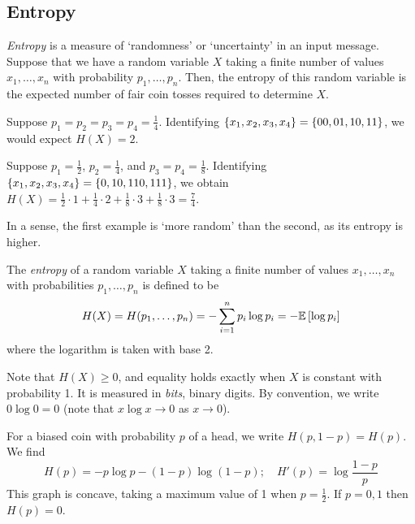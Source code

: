 \subsection{Entropy}
\emph{Entropy} is a measure of `randomness' or `uncertainty' in an input message.
Suppose that we have a random variable \( X \) taking a finite number of values \( x_1, \dots, x_n \) with probability \( p_1, \dots, p_n \).
Then, the entropy of this random variable is the expected number of fair coin tosses required to determine \( X \).
\begin{example}
    Suppose \( p_1 = p_2 = p_3 = p_4 = \frac{1}{4} \).
    Identifying \( \qty{x_1, x_2, x_3, x_4} = \qty{00, 01, 10, 11} \), we would expect \( H(X) = 2 \).
\end{example}
\begin{example}
    Suppose \( p_1 = \frac{1}{2} \), \( p_2 = \frac{1}{4} \), and \( p_3 = p_4 = \frac{1}{8} \).
    Identifying \( \qty{x_1, x_2, x_3, x_4} = \qty{0, 10, 110, 111} \), we obtain \( H(X) = \frac{1}{2} \cdot 1 + \frac{1}{4} \cdot 2 + \frac{1}{8} \cdot 3 + \frac{1}{8} \cdot 3 = \frac{7}{4} \).
\end{example}
In a sense, the first example is `more random' than the second, as its entropy is higher.
\begin{definition}
    The \emph{entropy} of a random variable \( X \) taking a finite number of values \( x_1, \dots, x_n \) with probabilities \( p_1, \dots, p_n \) is defined to be
    \[ H(X) = H(p_1, \dots, p_n) = -\sum_{i=1}^n p_i \log p_i = -\mathbb{E}\left[{\log p_i}\right] \]
    where the logarithm is taken with base 2.
\end{definition}
Note that \( H(X) \geq 0 \), and equality holds exactly when \( X \) is constant with probability 1.
It is measured in \emph{bits}, binary digits.
By convention, we write \( 0 \log 0 = 0 \) (note that \( x \log x \to 0 \) as \( x \to 0 \)).
\begin{example}
    For a biased coin with probability \( p \) of a head, we write \( H(p,1-p) = H(p) \).
    We find
    \[ H(p) = -p\log p - (1-p)\log(1-p);\quad H'(p) = \log \frac{1-p}{p} \]
    This graph is concave, taking a maximum value of 1 when \( p = \frac{1}{2} \).
    If \( p = 0, 1 \) then \( H(p) = 0 \).
\end{example}

